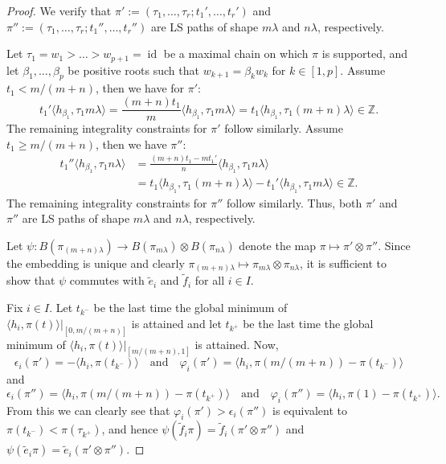 \documentclass[final]{amsart}
\theoremstyle{plain}
\theoremstyle{definition}
\newcommand{\bbZ}{\mathbb Z}
\newcommand{\te}{\tilde e}
\newcommand{\tf}{\tilde f}
\DeclareMathOperator{\id}{id}
\begin{document}
\begin{proof}
    We verify that $\pi' := (\tau_1, \dots, \tau_r; t_1', \dots, t_r')$ and $\pi'' := (\tau_1, \dots, \tau_r; t_1'', \dots, t_r'')$ are LS paths of shape $m\lambda$ and $n\lambda$, respectively.

    Let $\tau_1 = w_1 > \dots > w_{p+1} = \id$ be a maximal chain on which $\pi$ is supported, and let $\beta_1, \dots, \beta_p$ be positive roots such that $w_{k+1} = \beta_k w_k$ for $k \in [1, p]$.
    Assume $t_1 < m/(m+n)$, then we have for $\pi'$:
    \[
        t_1'\langle h_{\beta_1}, \tau_1 m\lambda\rangle  = \frac{(m+n)t_1}{m}\langle h_{\beta_1}, \tau_1 m\lambda\rangle = t_1\langle h_{\beta_1}, \tau_1 (m+n)\lambda\rangle \in \bbZ.
    \]
    The remaining integrality constraints for $\pi'$ follow similarly.
    Assume $t_1 \ge m/(m+n)$, then we have $\pi''$:
    \begin{align*}
        t_1''\langle h_{\beta_1}, \tau_1 n\lambda\rangle
        &= \frac{(m+n)t_1 - m t_1'}{n}\langle h_{\beta_1}, \tau_1 n\lambda\rangle \\
        &= t_1\langle h_{\beta_1}, \tau_1 (m+n)\lambda\rangle - t_1'\langle h_{\beta_1}, \tau_1 m\lambda\rangle \in \bbZ.
    \end{align*}
    The remaining integrality constraints for $\pi''$ follow similarly.
    Thus, both $\pi'$ and $\pi''$ are LS paths of shape $m\lambda$ and $n\lambda$, respectively.

    Let $\psi\colon B(\pi_{(m+n)\lambda}) \to B(\pi_{m\lambda}) \otimes B(\pi_{n\lambda})$ denote the map $\pi \mapsto \pi' \otimes \pi''$.
    Since the embedding is unique and clearly $\pi_{(m+n)\lambda} \mapsto \pi_{m\lambda} \otimes \pi_{n\lambda}$, it is sufficient to show that $\psi$ commutes with $\te_i$ and $\tf_i$ for all $i \in I$.

    Fix $i\in I$.
    Let $t_{k^-}$ be the last time the global minimum of $\langle h_i, \pi(t)\rangle|_{[0,m/(m+n)]}$ is attained and let $t_{k^+}$ be the last time the global minimum of $\langle h_i, \pi(t)\rangle|_{[m/(m+n),1]}$ is attained.
    Now,
    \[
        \epsilon_i(\pi') = -\langle h_i, \pi(t_{k^-})\rangle
        \quad \text{and} \quad
        \varphi_i(\pi') = \langle h_i, \pi(m/(m+n)) - \pi(t_{k^-})\rangle
    \]
    and
    \[
        \epsilon_i(\pi'') = \langle h_i, \pi(m/(m+n)) - \pi(t_{k^+})\rangle
        \quad \text{and} \quad
        \varphi_i(\pi'') = \langle h_i, \pi(1) - \pi(t_{k^+})\rangle.
    \]
    From this we can clearly see that $\varphi_i(\pi') > \epsilon_i(\pi'')$ is equivalent to $\pi(t_{k^-}) < \pi(\tau_{k^+})$, and hence $\psi(\tf_i\pi) = \tf_i(\pi'\otimes \pi'')$ and $\psi(\te_i\pi) = \te_i(\pi'\otimes \pi'')$.
\end{proof}
\end{document}
